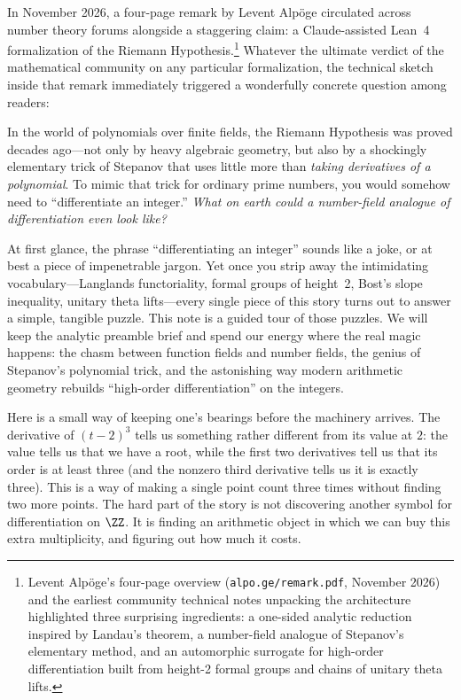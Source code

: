 
In November 2026, a four-page remark by Levent Alp\"oge circulated across number theory forums alongside a staggering claim: a Claude-assisted Lean~4 formalization of the Riemann Hypothesis.\footnote{Levent Alp\"oge's four-page overview (\texttt{alpo.ge/remark.pdf}, November 2026) and the earliest community technical notes unpacking the architecture highlighted three surprising ingredients: a one-sided analytic reduction inspired by Landau's theorem, a number-field analogue of Stepanov's elementary method, and an automorphic surrogate for high-order differentiation built from height-2 formal groups and chains of unitary theta lifts.} Whatever the ultimate verdict of the mathematical community on any particular formalization, the technical sketch inside that remark immediately triggered a wonderfully concrete question among readers:

\begin{question}[title={The puzzle at the heart of the story}]
In the world of polynomials over finite fields, the Riemann Hypothesis was proved decades ago---not only by heavy algebraic geometry, but also by a shockingly elementary trick of Stepanov that uses little more than \emph{taking derivatives of a polynomial}. To mimic that trick for ordinary prime numbers, you would somehow need to ``differentiate an integer.'' \emph{What on earth could a number-field analogue of differentiation even look like?}
\end{question}

At first glance, the phrase ``differentiating an integer'' sounds like a joke, or at best a piece of impenetrable jargon. Yet once you strip away the intimidating vocabulary---Langlands functoriality, formal groups of height~2, Bost's slope inequality, unitary theta lifts---every single piece of this story turns out to answer a simple, tangible puzzle. This note is a guided tour of those puzzles. We will keep the analytic preamble brief and spend our energy where the real magic happens: the chasm between function fields and number fields, the genius of Stepanov's polynomial trick, and the astonishing way modern arithmetic geometry rebuilds ``high-order differentiation'' on the integers.

Here is a small way of keeping one's bearings before the machinery arrives. The derivative of \((t-2)^3\) tells us something rather different from its value at \(2\): the value tells us that we have a root, while the first two derivatives tell us that its order is at least three (and the nonzero third derivative tells us it is exactly three). This is a way of making a single point count three times without finding two more points. The hard part of the story is not discovering another symbol for differentiation on \(\ZZ\). It is finding an arithmetic object in which we can buy this extra multiplicity, and figuring out how much it costs.

